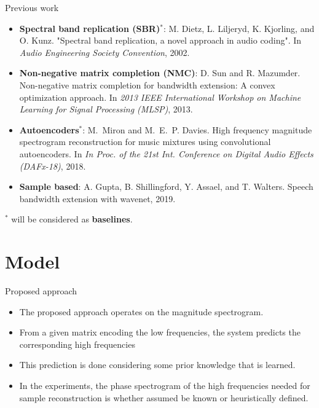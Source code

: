 \documentclass[compress]{beamer}
\begin{document}
\begin{frame}{Previous work}
  \begin{itemize}
    \item \textbf{Spectral band replication (SBR)$^*$}: M. Dietz, L. Liljeryd, K. Kjorling, and O. Kunz. "Spectral band replication, a novel approach in audio coding". In {\em Audio Engineering Society Convention}, 2002.
    \item \textbf{Non-negative matrix completion (NMC)}: D. Sun and R. Mazumder. Non-negative matrix completion for bandwidth extension: A convex optimization approach. In {\em 2013 IEEE International Workshop on Machine Learning for Signal Processing (MLSP)}, 2013.
    \item \textbf{Autoencoders$^*$}: M.~Miron and M.~E.~P. Davies. High frequency magnitude spectrogram reconstruction for music
      mixtures using convolutional autoencoders. In {\em In Proc. of the 21st Int. Conference on Digital Audio Effects
      (DAFx-18)}, 2018.
    \item \textbf{Sample based}: A. Gupta, B. Shillingford, Y. Assael, and T. Walters. Speech bandwidth extension with wavenet, 2019.
  \end{itemize}
  $^*$ will be considered as \textbf{baselines}.
\end{frame}



\section{Model}

\begin{frame}{Proposed approach}

  \begin{itemize}
    \item The proposed approach operates on the magnitude spectrogram.
    \item From a given matrix encoding the low frequencies, the system predicts the corresponding high frequencies
    \item This prediction is done considering some prior knowledge that is learned.
    \item In the experiments, the phase spectrogram of the high frequencies needed for sample reconstruction is whether assumed be known or heuristically defined.
  \end{itemize}
\end{frame}
\end{document}
